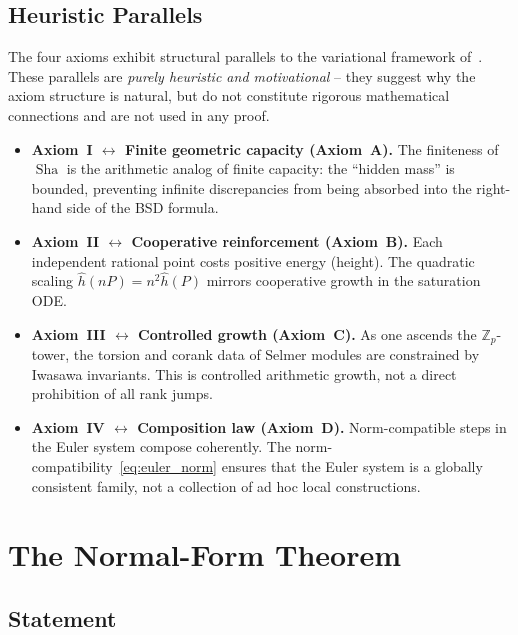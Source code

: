 \documentclass[aps,prd,twocolumn,superscriptaddress,nofootinbib,floatfix]{revtex4-2}
\theoremstyle{definition}
\theoremstyle{remark}
\DeclareMathOperator{\Sha}{Sha}
\begin{document}
\subsection{Heuristic Parallels}
\label{sec:heuristic}

The four axioms exhibit structural parallels to the variational framework of~\cite{FST-Unified2026}. These parallels are \textit{purely heuristic and motivational} -- they suggest why the axiom structure is natural, but do not constitute rigorous mathematical connections and are not used in any proof.

\begin{itemize}
\item \textbf{Axiom~I $\leftrightarrow$ Finite geometric capacity (Axiom~A).} The finiteness of $\Sha$ is the arithmetic analog of finite capacity: the ``hidden mass'' is bounded, preventing infinite discrepancies from being absorbed into the right-hand side of the BSD formula.

\item \textbf{Axiom~II $\leftrightarrow$ Cooperative reinforcement (Axiom~B).} Each independent rational point costs positive energy (height). The quadratic scaling $\hat{h}(nP) = n^2 \hat{h}(P)$ mirrors cooperative growth in the saturation ODE.

\item \textbf{Axiom~III $\leftrightarrow$ Controlled growth (Axiom~C).} As one ascends the $\mathbb{Z}_p$-tower, the torsion and corank data of Selmer modules are constrained by Iwasawa invariants. This is controlled arithmetic growth, not a direct prohibition of all rank jumps.

\item \textbf{Axiom~IV $\leftrightarrow$ Composition law (Axiom~D).} Norm-compatible steps in the Euler system compose coherently. The norm-compatibility~\eqref{eq:euler_norm} ensures that the Euler system is a globally consistent family, not a collection of ad hoc local constructions.
\end{itemize}


\clearpage
\section{The Normal-Form Theorem}
\label{sec:normal_form}

\subsection{Statement}
\end{document}

